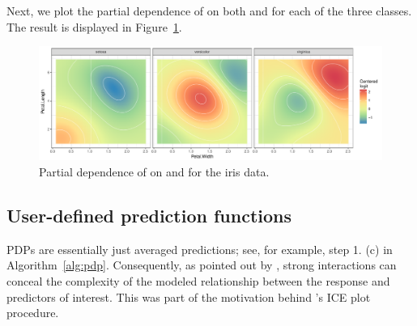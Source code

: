 Next, we plot the partial dependence of  on both  and  for each of the three classes. The result is displayed in Figure~\ref{fig:partial_iris}.

\begin{figure}[!htbp]
  \centering
  \includegraphics[width=1.0\linewidth]{partial_iris_svm}
  \caption{Partial dependence of  on  and  for the iris data.}
  \label{fig:partial_iris}
\end{figure}


\subsection{User-defined prediction functions}
\label{sec:prediction}

PDPs are essentially just averaged predictions; see, for example, step 1. (c) in Algorithm~\ref{alg:pdp}. Consequently, as pointed out by \citet{goldstein-peeking-2015}, strong interactions can conceal the complexity of the modeled relationship between the response and predictors of interest. This was part of the motivation behind \citeauthor*{goldstein-peeking-2015}'s ICE plot procedure.

